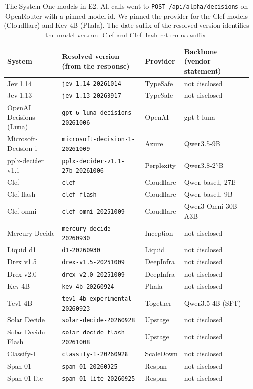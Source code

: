 \begin{table}[t]
\centering
\small
\begin{tabular}{llll}
\toprule
System & Resolved version (from the response) & Provider & Backbone (vendor statement) \\
\midrule
Jev 1.14 & \texttt{jev-1.14-20261014} & TypeSafe & not disclosed \\
Jev 1.13 & \texttt{jev-1.13-20260917} & TypeSafe & not disclosed \\
OpenAI Decisions (Luna) & \texttt{gpt-6-luna-decisions-20261006} & OpenAI & gpt-6-luna \\
Microsoft-Decision-1 & \texttt{microsoft-decision-1-20261009} & Azure & Qwen3.5-9B \\
pplx-decider v1.1 & \texttt{pplx-decider-v1.1-27b-20261006} & Perplexity & Qwen3.8-27B \\
Clef & \texttt{clef} & Cloudflare & Qwen-based, 27B \\
Clef-flash & \texttt{clef-flash} & Cloudflare & Qwen-based, 9B \\
Clef-omni & \texttt{clef-omni-20261009} & Cloudflare & Qwen3-Omni-30B-A3B \\
Mercury Decide & \texttt{mercury-decide-20260930} & Inception & not disclosed \\
Liquid d1 & \texttt{d1-20260930} & Liquid & not disclosed \\
Drex v1.5 & \texttt{drex-v1.5-20261009} & DeepInfra & not disclosed \\
Drex v2.0 & \texttt{drex-v2.0-20261009} & DeepInfra & not disclosed \\
Kev-4B & \texttt{kev-4b-20260924} & Phala & not disclosed \\
Tev1-4B & \texttt{tev1-4b-experimental-20260923} & Together & Qwen3.5-4B (SFT) \\
Solar Decide & \texttt{solar-decide-20260928} & Upstage & not disclosed \\
Solar Decide Flash & \texttt{solar-decide-flash-20261008} & Upstage & not disclosed \\
Classify-1 & \texttt{classify-1-20260928} & ScaleDown & not disclosed \\
Span-01 & \texttt{span-01-20260925} & Respan & not disclosed \\
Span-01-lite & \texttt{span-01-lite-20260925} & Respan & not disclosed \\
\bottomrule
\end{tabular}
\caption{The System One models in E2. All calls went to \texttt{POST /api/alpha/decisions} on OpenRouter with a pinned model id. We pinned the provider for the Clef models (Cloudflare) and Kev-4B (Phala). The date suffix of the resolved version identifies the model version. Clef and Clef-flash return no suffix.}
\label{tab:app-systems}
\end{table}
